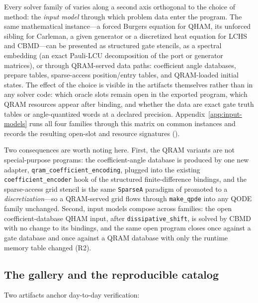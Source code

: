 Every solver family of  varies along a second axis
orthogonal to the choice of method: the \emph{input model} through which
problem data enter the program.  The same mathematical instance---a
forced Burgers equation for QHAM, its unforced sibling for Carleman, a
given generator or a discretized heat equation for LCHS and CBMD---can be
presented as structured gate stencils, as a spectral embedding (an exact
Pauli-LCU decomposition of the port or generator matrices), or through
QRAM-served data paths: coefficient angle databases, prepare tables,
sparse-access position/entry tables, and QRAM-loaded initial states.  The
effect of the choice is visible in the artifacts themselves rather than
in any solver code: which oracle slots remain open in the exported
program, which QRAM resources appear after binding, and whether the data
are exact gate truth tables or angle-quantized words at a declared
precision.  Appendix~\ref{app:input-models} runs all four families
through this matrix on common instances and records the resulting
open-slot and resource signatures ().

Two consequences are worth noting here.  First, the QRAM variants are
not special-purpose programs: the coefficient-angle database is produced
by one new adapter, \texttt{qram\_coefficient\_encoding}, plugged into
the existing \texttt{coefficient\_encoder} hook of the structured
finite-difference bindings, and the sparse-access grid stencil is the
same \texttt{SparseA} paradigm of  promoted to a
\emph{discretization}---so a QRAM-served grid flows through
\texttt{make\_qpde} into any QODE family unchanged.  Second, input models
compose across families: the open coefficient-database QHAM input, after
\texttt{dissipative\_shift}, is solved by CBMD with no change to its
bindings, and the same open program closes once against a gate database
and once against a QRAM database with only the runtime memory table
changed (R2).

\subsection{The gallery and the reproducible catalog}
\label{sec:gallery}

Two artifacts anchor day-to-day verification:

